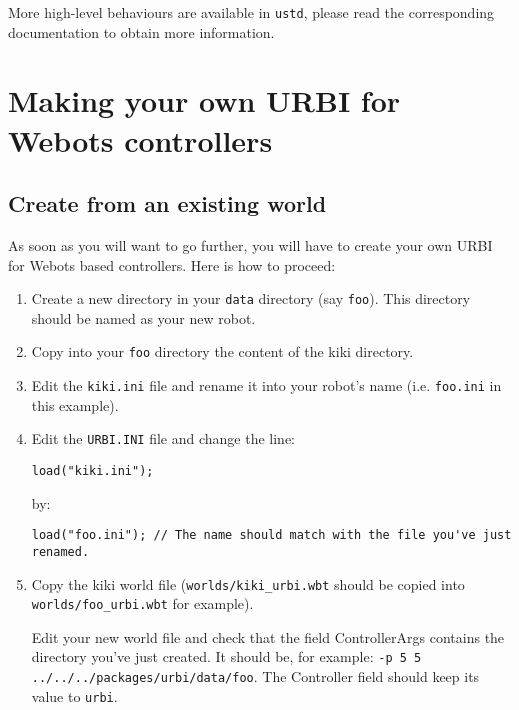 More high-level behaviours are available in \nolinkurl{ustd}, please
read the corresponding documentation to obtain more information.



\section{Making your own URBI for Webots controllers}
\label{webots.own}%

\subsection{Create from an existing world}
\label{webots.own.create}%

     As soon as you will want to go further, you will have to create your own
    URBI for Webots based controllers. Here is how to proceed:

\begin{enumerate}

\item      Create a new directory in your \nolinkurl{data} directory
     (say \nolinkurl{foo}). This directory should be named as your
     new robot.



\item      Copy into your \nolinkurl{foo} directory the content
     of the kiki directory.



\item     Edit the \nolinkurl{kiki.ini} file and rename it into your
    robot's name (i.e. \nolinkurl{foo.ini} in this example).



\item     Edit the \nolinkurl{URBI.INI} file and change the line:


\begin{lstlisting}[firstnumber=1,]
    load("kiki.ini");
\end{lstlisting}

by:

\begin{lstlisting}[firstnumber=1,]
    load("foo.ini"); // The name should match with the file you've just renamed.
\end{lstlisting}




\item Copy the kiki world file (\nolinkurl{worlds/kiki_urbi.wbt}
  should be copied into \nolinkurl{worlds/foo_urbi.wbt} for example).


  Edit your new world file and check that the field ControllerArgs
  contains the directory you've just created. It should be, for
  example: \texttt{-{}\-p 5 5
    .\-.\-/\-.\-.\-/\-.\-.\-/\-p\-a\-c\-k\-a\-g\-e\-s\-/\-u\-r\-b\-i\-/\-d\-a\-t\-a\-/\-f\-o\-o}.
  The Controller field should keep its value to \texttt{u\-r\-b\-i}.


\end{enumerate}

